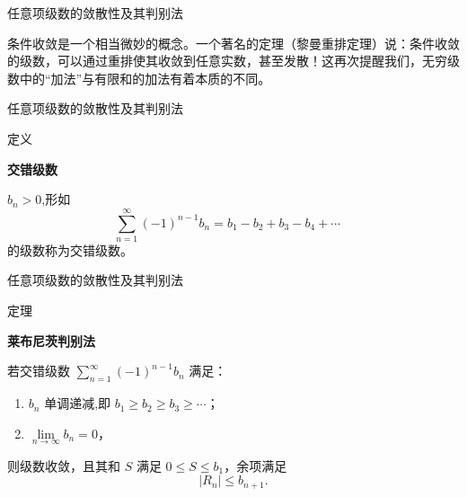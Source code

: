 \documentclass[aspectratio=169,10pt,fontset=fandol]{ctexbeamer}
\newenvironment{custom}[1]{\par\noindent\textbf{#1}\quad}{\par\vspace{0.8em}}
\begin{document}
\begin{frame}[t,fragile]{任意项级数的敛散性及其判别法}
\footnotesize
{\footnotesize
条件收敛是一个相当微妙的概念。一个著名的定理（黎曼重排定理）说：条件收敛的级数，可以通过重排使其收敛到任意实数，甚至发散！这再次提醒我们，无穷级数中的“加法”与有限和的加法有着本质的不同。

}
\end{frame}
\begin{frame}[t,fragile]{任意项级数的敛散性及其判别法}
\footnotesize
\begin{block}{定义}
{\footnotesize
\textbf{交错级数}\par

$b_n > 0$,形如
\[
\sum_{n=1}^{\infty} (-1)^{n-1} b_n = b_1 - b_2 + b_3 - b_4 + \cdots \quad 
\]
的级数称为交错级数。

}
\end{block}
\end{frame}
\begin{frame}[t,fragile]{任意项级数的敛散性及其判别法}
\footnotesize
\begin{block}{定理}
{\footnotesize
\textbf{莱布尼茨判别法}\par

若交错级数 \(\sum_{n=1}^{\infty} (-1)^{n-1} b_n\) 满足：
\begin{enumerate}
\item \(b_n\) 单调递减,即 \(b_1 \geq b_2 \geq b_3 \geq \cdots\)；
\item \(\lim\limits_{n\to\infty} b_n = 0\)，
\end{enumerate}
则级数收敛，且其和 \(S\) 满足 \(\boxed{0\leq S\leq b_1}\)，余项满足
\[
\boxed{|R_n|\le b_{n+1}}.
\]

}
\end{block}
\end{frame}
\end{document}
